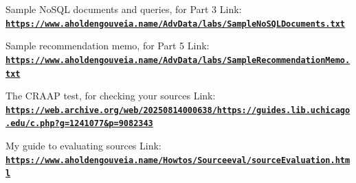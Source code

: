 \documentclass[12pt]{article}
\begin{document}
Sample NoSQL documents and queries, for Part 3
Link: \href{https://www.aholdengouveia.name/AdvData/labs/SampleNoSQLDocuments.txt}{\textbf{\nolinkurl{https://www.aholdengouveia.name/AdvData/labs/SampleNoSQLDocuments.txt}}}

Sample recommendation memo, for Part 5
Link: \href{https://www.aholdengouveia.name/AdvData/labs/SampleRecommendationMemo.txt}{\textbf{\nolinkurl{https://www.aholdengouveia.name/AdvData/labs/SampleRecommendationMemo.txt}}}

The CRAAP test, for checking your sources
Link: \href{https://web.archive.org/web/20250814000638/https://guides.lib.uchicago.edu/c.php?g=1241077&p=9082343}{\textbf{\nolinkurl{https://web.archive.org/web/20250814000638/https://guides.lib.uchicago.edu/c.php?g=1241077&p=9082343}}}

My guide to evaluating sources
Link: \href{https://www.aholdengouveia.name/Howtos/Sourceeval/sourceEvaluation.html}{\textbf{\nolinkurl{https://www.aholdengouveia.name/Howtos/Sourceeval/sourceEvaluation.html}}}
\end{document}
